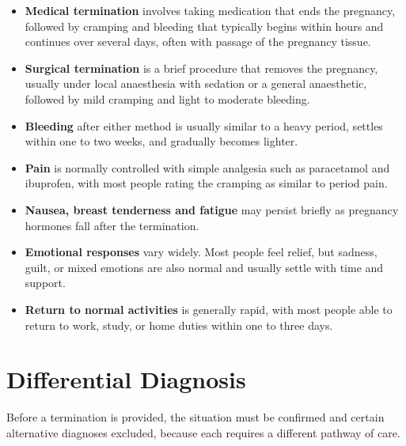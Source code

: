 \begin{itemize}
    \item \textbf{Medical termination} involves taking medication that ends the pregnancy, followed by cramping and bleeding that typically begins within hours and continues over several days, often with passage of the pregnancy tissue.
    \item \textbf{Surgical termination} is a brief procedure that removes the pregnancy, usually under local anaesthesia with sedation or a general anaesthetic, followed by mild cramping and light to moderate bleeding.
    \item \textbf{Bleeding} after either method is usually similar to a heavy period, settles within one to two weeks, and gradually becomes lighter.
    \item \textbf{Pain} is normally controlled with simple analgesia such as paracetamol and ibuprofen, with most people rating the cramping as similar to period pain.
    \item \textbf{Nausea, breast tenderness and fatigue} may persist briefly as pregnancy hormones fall after the termination.
    \item \textbf{Emotional responses} vary widely. Most people feel relief, but sadness, guilt, or mixed emotions are also normal and usually settle with time and support.
    \item \textbf{Return to normal activities} is generally rapid, with most people able to return to work, study, or home duties within one to three days.
\end{itemize}

\section*{Differential Diagnosis}
Before a termination is provided, the situation must be confirmed and certain alternative diagnoses excluded, because each requires a different pathway of care.

